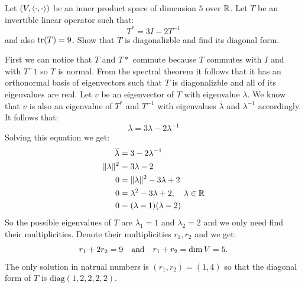 \documentclass[11pt, a4paper]{article}
\begin{document}
\begin{exercise}
  Let $(V, \left\langle \cdot, \cdot \right\rangle)$ be an inner product space
  of dimension $5$ over $\mathbb{R}$. Let $T$ be an invertible linear operator such
  that:
  \[
    T^* = 3I - 2T^{-1}
  \]
  and also $\operatorname{tr}(T)=9$.
  Show that $T$ is diagonalizble and find its diagonal form.
\end{exercise}
\begin{solution}
  First we can notice that $T$ and $T*$ commute because $T$ commutes with $I$ and
  with $T^-1$ so $T$ is normal. From the spectral theorem it follows that it
  has an orthonormal basis of eigenvectors such that $T$ is diagonalizble and all
  of its eigenvalues are real. Let $v$ be an eigenvector of $T$
  with eigenvalue $\lambda$. We know that $v$ is also an eigenvalue of $T^*$
  and $T^{-1}$ with eigenvalues $\overline{\lambda}$ and $\lambda^{-1}$ accordingly.
  It follows that:
  \[
    \overline{\lambda} = 3\lambda - 2\lambda^{-1}
  \]
  Solving this equation we get:
  \begin{align*}
    \overline{\lambda} &= 3 - 2\lambda^{-1} \\
    \|\lambda\|^2 &= 3\lambda - 2 \\
    0 &= \|\lambda\|^2 - 3\lambda + 2 \\
    0 &= \lambda^2 - 3\lambda + 2, \quad \lambda\in\mathbb{R} \\
    0 &= (\lambda - 1)(\lambda - 2) \\
  \end{align*}
  So the possible eigenvalues of $T$ are $\lambda_1 = 1$ and $\lambda_2 = 2$ and 
  we only need find their multiplicities. Denote their multiplicities $r_1,r_2$
  and we get:
  \[
    r_1 + 2r_2 = 9 \quad \text{and} \quad
    r_1 + r_2 = \dim V = 5.
  \]
  The only solution in natrual numbers is $(r_1,r_2) = (1,4)$ so that the
  diagonal form of $T$ is $\mathrm{diag(1,2,2,2,2)}$.
\end{solution}
\end{document}
